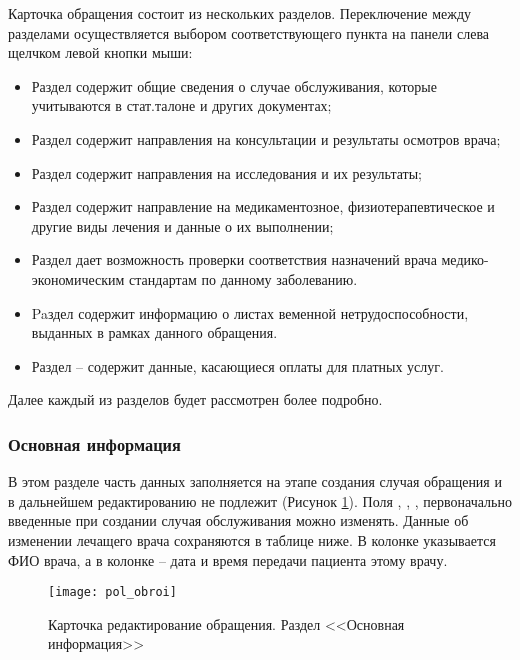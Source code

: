 Карточка обращения состоит из нескольких разделов. Переключение между разделами осуществляется выбором соответствующего пункта на панели слева щелчком левой кнопки мыши:
\begin{itemize}
 \item Раздел  содержит общие сведения о случае обслуживания, которые учитываются в стат.талоне и других документах;
 \item Раздел  содержит направления на консультации и результаты осмотров врача;
 \item Раздел  содержит направления на исследования и их результаты;
 \item Раздел  содержит направление на медикаментозное, физиотерапевтическое и другие виды лечения и данные о их выполнении;
 \item Раздел  дает возможность проверки соответствия назначений врача медико-экономическим стандартам по данному заболеванию.
 \item Paздел  содержит информацию о листах веменной нетрудоспособности, выданных в рамках данного обращения.
 \item Раздел  – содержит данные, касающиеся оплаты для платных услуг.
\end{itemize}
 
Далее каждый из разделов будет рассмотрен более подробно.

\subsubsection{Основная информация}

В этом разделе часть данных заполняется на этапе создания случая обращения и в дальнейшем редактированию не подлежит (Рисунок \ref{img_pol_obroi}). Поля , , , первоначально введенные при создании случая обслуживания можно изменять. Данные об изменении лечащего врача сохраняются в таблице ниже. В колонке  указывается ФИО врача, а в колонке  – дата и время передачи пациента этому врачу.

\begin{figure}[ht]\centering
 \texttt{[image: pol\_obroi]}
 \caption{Карточка редактирование обращения. Раздел <<Основная информация>>}
 \label{img_pol_obroi}
\end{figure}

